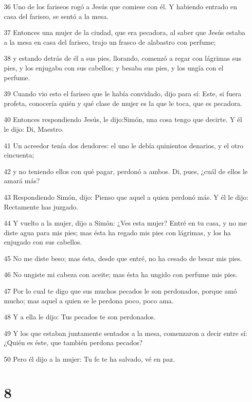\par 36 Uno de los fariseos rogó a Jesús que comiese con él. Y habiendo entrado en casa del fariseo, se sentó a la mesa.
\par 37 Entonces una mujer de la ciudad, que era pecadora, al saber que Jesús estaba a la mesa en casa del fariseo, trajo un frasco de alabastro con perfume;
\par 38 y estando detrás de él a sus pies, llorando, comenzó a regar con lágrimas sus pies, y los enjugaba con sus cabellos; y besaba sus pies, y los ungía con el perfume.
\par 39 Cuando vio esto el fariseo que le había convidado, dijo para sí: Este, si fuera profeta, conocería quién y qué clase de mujer es la que le toca, que es pecadora.
\par 40 Entonces respondiendo Jesús, le dijo:Simón, una cosa tengo que decirte. Y él le dijo: Di, Maestro.
\par 41 Un acreedor tenía dos deudores: el uno le debía quinientos denarios, y el otro cincuenta;
\par 42 y no teniendo ellos con qué pagar, perdonó a ambos. Di, pues, ¿cuál de ellos le amará más?
\par 43 Respondiendo Simón, dijo: Pienso que aquel a quien perdonó más. Y él le dijo: Rectamente has juzgado.
\par 44 Y vuelto a la mujer, dijo a Simón: ¿Ves esta mujer? Entré en tu casa, y no me diste agua para mis pies; mas ésta ha regado mis pies con lágrimas, y los ha enjugado con sus cabellos.
\par 45 No me diste beso; mas ésta, desde que entré, no ha cesado de besar mis pies.
\par 46 No ungiste mi cabeza con aceite; mas ésta ha ungido con perfume mis pies.
\par 47 Por lo cual te digo que sus muchos pecados le son perdonados, porque amó mucho; mas aquel a quien se le perdona poco, poco ama.
\par 48 Y a ella le dijo: Tus pecados te son perdonados.
\par 49 Y los que estaban juntamente sentados a la mesa, comenzaron a decir entre sí: ¿Quién es éste, que también perdona pecados?
\par 50 Pero él dijo a la mujer: Tu fe te ha salvado, vé en paz.

\chapter{8}

